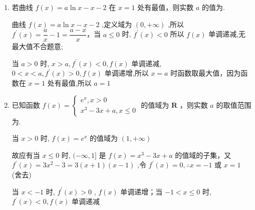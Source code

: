 \begin{enumerate}
\begin{jieda}
        令 ${V}^{\prime }\left( x\right)  = {12}{x}^{2} - {24x} + 9 > 0$ ,解得 $x < \dfrac{1}{2}$ 或 $x > \dfrac{3}{2}$
        
        令 ${V}^{\prime }\left( x\right)  = {12}{x}^{2} - {24x} + 9 < 0$ ,解得 $\dfrac{1}{2} < x < \dfrac{3}{2}$ .
        
        因为函数 $V\left( {x}\right)$ 的定义域为 $x \in  \left( {0,\dfrac{3}{2}}\right)$，所以函数 $V\left( {x}\right)$ 在 $\left( {0,\dfrac{1}{2}}\right)$ 上单调递增,在 $\left( {\dfrac{1}{2},\dfrac{3}{2}}\right)$ 上单调递减，所以 $V\left( x\right)$ 在 $x = \dfrac{1}{2}$ 处取得极大值即最大值,所以 $V{\left( x\right) }_{\max } = V\left( \dfrac{1}{2}\right)  = 2$，即该方盒容积最大为 $2{{m}}^{3}$ .
    \end{jieda}

    \item 若曲线 $f\left( x\right)  = a\ln x - x - 2$ 在 $x = 1$ 处有最值，则实数 $a$ 的值为.
    \begin{jieda}
        曲线 $f\left( x\right)  = a\ln x - x - 2$ ,定义域为 $\left( {0, + \infty }\right)$ ,所以 ${f}^{\prime }\left( x\right)  = \dfrac{a}{x} - 1 = \dfrac{a - x}{x}$，当 $a \leq  0$ 时, ${f}^{\prime }\left( x\right)  < 0$ 所以 $f\left( x\right)$ 单调递减,无最大值不合题意;
        
        当 $a > 0$ 时, $x > a,{f}^{\prime }\left( x\right)  < 0,f\left( x\right)$ 单调递减, $0 < x <a, {f}^{\prime }\left( x\right) >  0,f\left( x\right)$ 单调递增,所以 $x = a$ 时函数取最大值，因为函数在 $x = 1$ 处有最值,所以 $a = 1$
    \end{jieda}

    \item 已知函数 $f\left( x\right)  = \left\{  \begin{array}{l} {{e}}^{x},x > 0 \\  {x}^{3} - {3x} + a,x \leq  0 \end{array}\right.$ 的值域为 $\mathbf{R}$ ，则实数 $a$ 的取值范围为\blkda{$[-1, +\infty)$}.
    \begin{jieda}
        当 $x > 0$ 时, $f\left( x\right)  = {e}^{x}$ 的值域为 $\left( {1, + \infty }\right)$

        故应有当 $x \leq  0$ 时, $( - \infty ,1\rbrack$ 是 $f\left( x\right)  = {x}^{3} - {3x} + a$ 的值域的子集，又 ${f}^{\prime }\left( x\right)  = 3{x}^{2} - 3 = 3\left( {x + 1}\right) \left( {x - 1}\right)$ ,令 ${f}^{\prime }\left( x\right)  = 0,\therefore x =  - 1$ 或 $x = 1$ (舍去)
        
        当 $x <  - 1$ 时, ${f}^{\prime }\left( x\right)  > 0$ , $f\left( x\right)$ 单调递增；当 $- 1 < x \leq  0$ 时, ${f}^{\prime }\left( x\right)  < 0,f\left( x\right)$ 单调递减
        

\end{jieda}
\end{enumerate}
